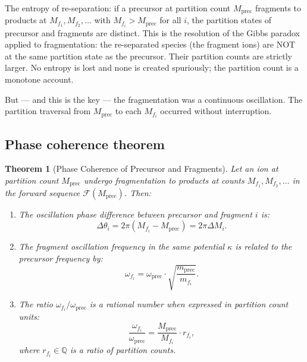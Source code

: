 \documentclass[twocolumn,10pt,a4paper]{article}
\theoremstyle{thmstyle}
\newtheorem{theorem}{Theorem}[section]
\theoremstyle{definition}
\theoremstyle{remark}
\newcommand{\Q}{\mathbb{Q}}
\newcommand{\calF}{\mathcal{F}}
\begin{document}
The entropy of re-separation: if a precursor at partition count $M_{\text{prec}}$
fragments to products at $M_{f_1}, M_{f_2}, \ldots$ with
$M_{f_i} > M_{\text{prec}}$ for all $i$, the partition states of
precursor and fragments are distinct. This is the resolution of the
Gibbs paradox applied to fragmentation: the re-separated species (the
fragment ions) are NOT at the same partition state as the precursor.
Their partition counts are strictly larger. No entropy is lost and none
is created spuriously; the partition count is a monotone account.

But --- and this is the key --- the fragmentation was a continuous
oscillation. The partition traversal from $M_{\text{prec}}$ to each
$M_{f_i}$ occurred without interruption.

\subsection{Phase coherence theorem}

\begin{theorem}[Phase Coherence of Precursor and Fragments]
\label{thm:phase-coherence}
Let an ion at partition count $M_{\text{prec}}$ undergo fragmentation
to products at counts $M_{f_1}, M_{f_2}, \ldots$ in the forward sequence
$\calF(M_{\text{prec}})$. Then:
\begin{enumerate}[nosep,label=(\roman*)]
\item The oscillation phase difference between precursor and fragment $i$ is:
\begin{equation}
\Delta\theta_i = 2\pi(M_{f_i} - M_{\text{prec}}) = 2\pi\Delta M_i.
\label{eq:phase-diff}
\end{equation}
\item The fragment oscillation frequency in the same potential $\kappa$
is related to the precursor frequency by:
\begin{equation}
\omega_{f_i} = \omega_{\text{prec}} \cdot \sqrt{\frac{m_{\text{prec}}}{m_{f_i}}}.
\label{eq:frag-freq}
\end{equation}
\item The ratio $\omega_{f_i}/\omega_{\text{prec}}$ is a rational number
when expressed in partition count units:
\begin{equation}
\frac{\omega_{f_i}}{\omega_{\text{prec}}} = \frac{M_{\text{prec}}}{M_{f_i}}
\cdot r_{f_i},
\label{eq:rational}
\end{equation}
where $r_{f_i} \in \Q$ is a ratio of partition counts.
\end{enumerate}
\end{theorem}
\end{document}
